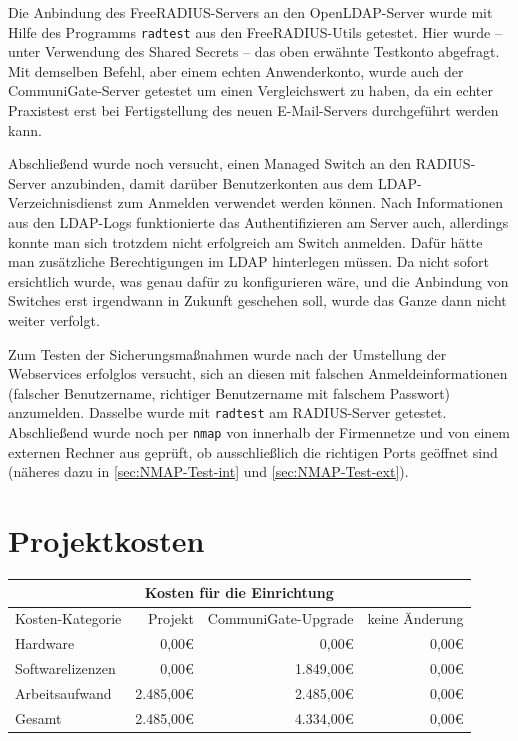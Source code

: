 \documentclass[11pt,a4paper,titlepage=firstiscover,headsepline,bibtotoc]{scrartcl} %
\newcommand{\hilight}[1]{\colorbox{yellow}{#1}} %
\newcommand{\mcc}[2]{\multicolumn{#1}{|c|}{#2}} %
\begin{document}
Die Anbindung des FreeRADIUS-Servers an den OpenLDAP-Server wurde mit Hilfe des Programms \texttt{radtest} aus den FreeRADIUS-Utils getestet. Hier wurde -- unter Verwendung des Shared Secrets -- das oben erwähnte Testkonto abgefragt. Mit demselben Befehl, aber einem echten Anwenderkonto, wurde auch der CommuniGate-Server getestet um einen Vergleichswert zu haben, da ein echter Praxistest erst bei Fertigstellung des neuen E-Mail-Servers durchgeführt werden kann.

Abschließend wurde noch versucht, einen Managed Switch an den RADIUS-Server anzubinden, damit darüber Benutzerkonten aus dem LDAP-Verzeichnisdienst zum Anmelden verwendet werden können. Nach Informationen aus den LDAP-Logs funktionierte das Authentifizieren am Server auch, allerdings konnte man sich trotzdem nicht erfolgreich am Switch anmelden. Dafür hätte man zusätzliche Berechtigungen im LDAP hinterlegen müssen. Da nicht sofort ersichtlich wurde, was genau dafür zu konfigurieren wäre, und die Anbindung von Switches erst irgendwann in Zukunft geschehen soll, wurde das Ganze dann nicht weiter verfolgt.

\medskip \noindent
Zum Testen der Sicherungsmaßnahmen wurde nach der Umstellung der Webservices erfolglos versucht, sich an diesen mit falschen Anmeldeinformationen (falscher Benutzername, richtiger Benutzername mit falschem Passwort) anzumelden. Dasselbe wurde mit \texttt{radtest} am RADIUS-Server getestet.
Abschließend wurde noch per \texttt{nmap} von innerhalb der Firmennetze und von einem externen Rechner aus geprüft, ob ausschließlich die richtigen Ports geöffnet sind (näheres dazu in \autoref{sec:NMAP-Test-int} und \autoref{sec:NMAP-Test-ext}).


\section{Projektkosten}\label{sec:Kosten}
\begin{tabularx}{\textwidth}{|X|r|r|r|}
\hline
\mcc{4}{Kosten für die Einrichtung}\\
\hline
Kosten-Kategorie	&	Projekt &	CommuniGate-Upgrade &	keine Änderung\\
\hline
Hardware &	0,00\euro{} &	0,00\euro{} &	0,00\euro{}\\
\hline
Softwarelizenzen &	0,00\euro{} &	1.849,00\euro{} &	0,00\euro{}\\
\hline
Arbeitsaufwand &	2.485,00\euro{} &	2.485,00\euro{} &	0,00\euro{}\\
\hhline{|=|=|=|=|}
Gesamt &	2.485,00\euro{} &	4.334,00\euro{} &	0,00\euro{}\\
\hline
\end{tabularx}
\end{document}
